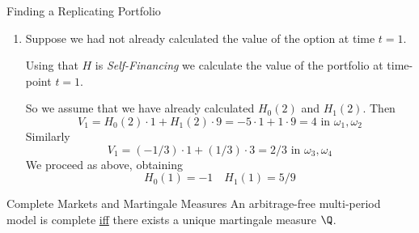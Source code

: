\documentclass[11pt,a4paper]{article}
\begin{document}
\begin{example}{Finding a Replicating Portfolio}
\begin{enumerate}
      \par Writing $H_0(1)$ for $H_0(1)(\omega_1,\dots,\omega_4)$ and $H_1(1)$ for $H_1(1)(\omega_1,\dots,\omega_4)$, we have
      \[\begin{array}{rcrcl}
        V_1(\omega)&=&4&=&H_0(1)\cdot B_1+H_1(1)\cdot9\text{ for }\omega\in\{\omega_1,\omega_2\}\\
        V_1(\omega)&=&2/3&=&H_0(1)\cdot B_1+H_1(1)\cdot3\text{ for }\omega\in\{\omega_3,\omega_4\}
      \end{array}\]
      Solving these equations, and noting $B_1=1$, gives $H_0(1)=-1$ and $H_1(1)=5/9$.
      \par Note that this confirms our calculation for $V_0$, since this portfolio costs $-1+6(5/9)=7/3$ at time $t=0$.
      \item Suppose we had not already calculated the value of the option at time $t=1$.
      \par Using that $H$ is \textit{Self-Financing} we calculate the value of the portfolio at time-point $t=1$.
      \par So we assume that we have already calculated $H_0(2)$ and $H_1(2)$. Then
      \[ V_1=H_0(2)\cdot1+H_1(2)\cdot9=-5\cdot1+1\cdot9=4\text{ in }\omega_1,\omega_2 \]
      Similarly
      \[ V_1=(-1/3)\cdot1+(1/3)\cdot 3=2/3\text{ in }\omega_3,\omega_4 \]
      We proceed as above, obtaining
      \[ H_0(1)=-1\quad H_1(1)=5/9 \]
    \end{enumerate}
  \end{example}

  \begin{proposition}{Complete Markets and Martingale Measures}\label{prop_complete_model_and_martingale_measures}
    An arbitrage-free multi-period model is complete \underline{iff} there exists a unique martingale measure $\Q$.
  \end{proposition}
\end{document}
